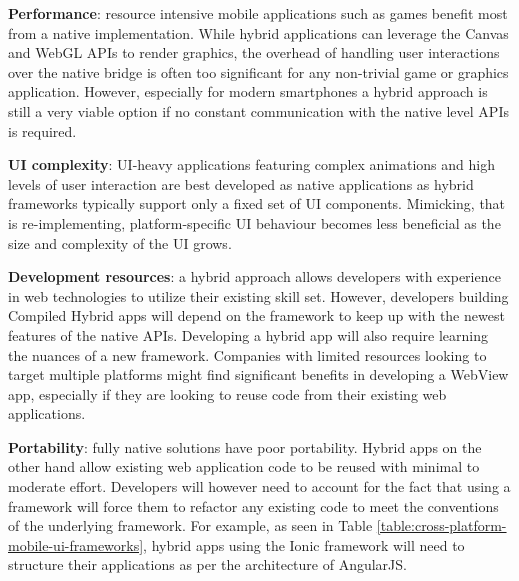 \documentclass[thesis.tex]{subfiles}
\begin{document}
\begin{itemize}

	\begin{item}
	\textbf{Performance}: resource intensive mobile applications such as games benefit most from a native implementation. While hybrid applications can leverage the Canvas and WebGL APIs to render graphics, the overhead of handling user interactions over the native bridge is often too significant for any non-trivial game or graphics application. However, especially for modern smartphones a hybrid approach is still a very viable option if no constant communication with the native level APIs is required.
	\end{item}

	\begin{item}
	\textbf{UI complexity}: UI-heavy applications featuring complex animations and high levels of user interaction are best developed as native applications as hybrid frameworks typically support only a fixed set of UI components. Mimicking, that is re-implementing, platform-specific UI behaviour becomes less beneficial as the size and complexity of the UI grows.
	\end{item}

	\begin{item}
	\textbf{Development resources}: a hybrid approach allows developers with experience in web technologies to utilize their existing skill set. However, developers building Compiled Hybrid apps will depend on the framework to keep up with the newest features of the native APIs. Developing a hybrid app will also require learning the nuances of a new framework. Companies with limited resources looking to target multiple platforms might find significant benefits in developing a WebView app, especially if they are looking to reuse code from their existing web applications.
	\end{item}

	\begin{item}
	\textbf{Portability}: fully native solutions have poor portability. Hybrid apps on the other hand allow existing web application code to be reused with minimal to moderate effort. Developers will however need to account for the fact that using a framework will force them to refactor any existing code to meet the conventions of the underlying framework. For example, as seen in Table \ref{table:cross-platform-mobile-ui-frameworks}, hybrid apps using the Ionic framework will need to structure their applications as per the architecture of AngularJS.
	\end{item}

\end{itemize}
\end{document}
